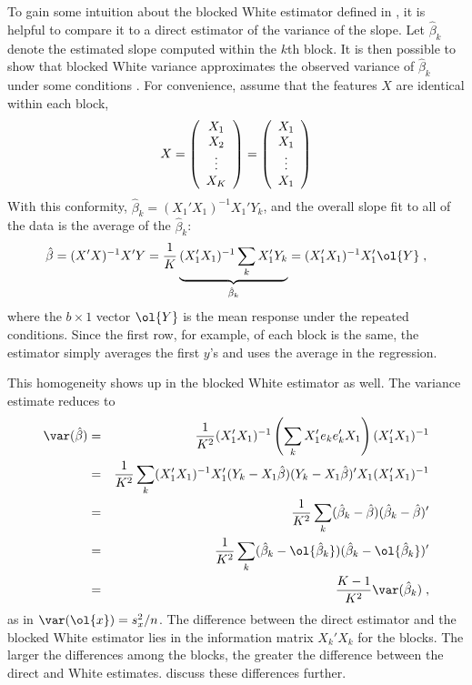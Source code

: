 \documentclass[12pt]{article}
\begin{document}
 To gain some intuition about the blocked White estimator defined in
 , it is helpful to compare it to a direct estimator of the
 variance of the slope.  Let $\hat\beta_k$ denote the estimated slope computed
 within the $k$th block.  It is then possible to show that blocked White
 variance approximates the observed variance of $\hat\beta_k$ under some
 conditions \citep{fosterlin10}.  For convenience, assume that the features $X$
 are identical within each block,
\begin{displaymath}
   X = 
    \left( \begin{array}{c}
       X_1 \cr  X_2 \cr \vdots \cr X_K 
    \end{array} \right)
    = 
    \left( \begin{array}{c}
       X_1 \cr  X_1 \cr \vdots \cr X_1 
    \end{array} \right)
\end{displaymath}
 With this conformity, $\hat\beta_k = (X_1'X_1)^{-1}X_1'Y_k$, and the
 overall slope fit to all of the data is the average of the $\hat\beta_k$:
\begin{displaymath}
  \hat\beta = (X'X)^{-1}X'Y 
       = \frac{1}{K} \underbrace{(X_1'X_1)^{-1} \sum_k X_1'Y_k}_{\hat\beta_k}
       = (X_1'X_1)^{-1} X_1' \ol{Y} \;,
\end{displaymath}
 where the $b \times 1$ vector $\ol{Y}$ is the mean response under the repeated
 conditions. Since the first row, for example, of each block is the same, the
 estimator simply averages the first $y$'s and uses the average in the
 regression.

 This homogeneity shows up in the blocked White estimator as well. The variance
 estimate  reduces to
\begin{eqnarray}
  \var(\hat\beta) 
   &=& \frac{1}{K^2}
       (X_1'X_1)^{-1} \left(\sum_k X_1'e_k e_k'X_1\right) (X_1'X_1)^{-1} \cr
   &=& \frac{1}{K^2}\sum_k (X_1'X_1)^{-1}X_1'(Y_k-X_1\hat\beta)
                           (Y_k-X_1\hat\beta)'X_1 (X_1'X_1)^{-1} \cr
   &=& \frac{1}{K^2}\sum_k (\hat\beta_k-\hat\beta)(\hat\beta_k-\hat\beta)'\cr
   &=& \frac{1}{K^2}\sum_k (\hat\beta_k-\ol{\hat\beta_k})
                           (\hat\beta_k-\ol{\hat\beta_k})'  \cr
   &=& \frac{K-1}{K^2} \var(\hat\beta_k) \;,
\end{eqnarray}
 as in $\var(\ol{x}) = s_x^2/n$.  The difference between the direct estimator
 and the blocked White estimator lies in the information matrix $X_k'X_k$ for
 the blocks.  The larger the differences among the blocks, the greater the
 difference between the direct and White estimates. \citet{fosterlin10} discuss
 these differences further.
\end{document}

